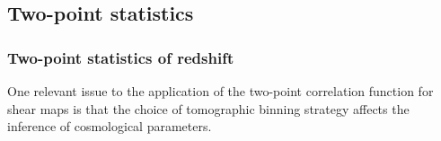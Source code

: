 \documentclass[12pt, onecolumn]{emulateapj}
\begin{document}
%
%

\subsection{Two-point statistics}
\subsubsection{Two-point statistics of redshift}

One relevant issue to the application of the two-point correlation function for shear maps is that the choice of tomographic binning strategy affects the inference of cosmological parameters.
\end{document}
